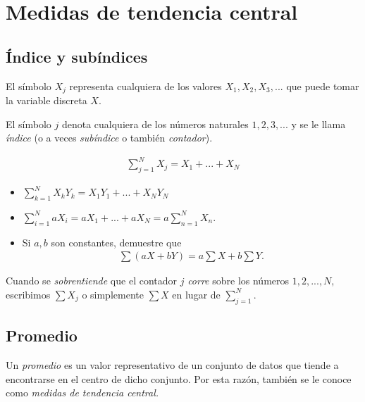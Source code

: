\section{Medidas de tendencia central}

\subsection{\'Indice y subíndices}
El símbolo $X_{j}$ representa cualquiera de los  valores $X_{1},X_{2},X_{3},...$ que puede tomar la variable discreta $X.$


El símbolo $j$ denota cualquiera de los números naturales $1,2,3,...$ y se le llama \emph{índice} (o a veces \emph{subíndice} o también \emph{contador}).




\begin{definicion}[Sumatoria]
	\begin{align}
		\sum_{j=1}^{N}X_{j}=X_{1}+...+X_{N}
	\end{align}
\end{definicion}



\begin{ejemplo}
	\begin{itemize}
		\item $\displaystyle \sum_{k=1}^{N}X_{k}Y_{k}=
		X_{1}Y_{1}+...+X_{N}Y_{N}$
		\item $\displaystyle \sum_{i=1}^{N} aX_{i}=
		aX_{1}+...+aX_{N}=a\sum_{n=1}^{N}X_{n}.$
		\item 
		Si $a,b$ son constantes, demuestre que
		\begin{align}
			\sum \left( aX+bY \right)=a\sum X + b\sum Y.
		\end{align}
	\end{itemize}
	
\end{ejemplo}



\begin{observacion}
	Cuando se \emph{sobrentiende} que el contador $j$ \emph{corre} sobre los números $1,2,...,N,$ escribimos $\sum X_{j}$ o simplemente $\sum X$ en lugar de $\sum_{j=1}^{N}.$
\end{observacion}


\subsection{Promedio}
Un \emph{promedio} es un valor representativo de un conjunto de datos que tiende a encontrarse en el centro de dicho conjunto. Por esta razón, también se le conoce como \emph{medidas de tendencia central.}



